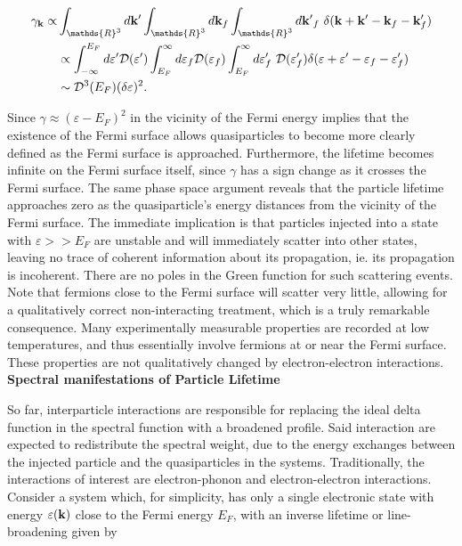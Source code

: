 \documentclass{homework}
\begin{document}
\begin{equation} \begin{split}
    \gamma_{\bf k} \propto & \int_{\mathds{R}^3} d{\bf k'} \int_{\mathds{R}^3} d{\bf k}_{f} \int_{\mathds{R}^3} d{\bf k'}_{f} \blanky \delta({\bf k} + {\bf k'} - {\bf k}_f - {\bf k}'_{f}) \\
    & \propto \int_{-\infty}^{E_F} d \varepsilon' \mathcal{D}(\varepsilon') \int_{E_F}^{\infty} d\varepsilon_{f} \mathcal{D}(\varepsilon_f) \int_{E_F}^{\infty} d\varepsilon'_{f}  \blanky \mathcal{D}(\varepsilon'_f) \delta(\varepsilon + \varepsilon' - \varepsilon_f - \varepsilon'_f) \\
    & \sim \mathcal{D}^{3}(E_F) (\delta \varepsilon)^2.
\end{split}
\end{equation}

Since $\gamma \approx (\varepsilon - E_F)^2$ in the vicinity of the Fermi energy implies that the existence of the Fermi surface allows quasiparticles to become more clearly defined as the Fermi surface is approached. Furthermore, the lifetime becomes infinite on the Fermi surface itself, since $\gamma$ has a sign change as it crosses the Fermi surface. The same phase space argument reveals that the particle lifetime approaches zero as the quasiparticle's energy distances from the vicinity of the Fermi surface. The immediate implication is that particles injected into a state with $\varepsilon >> E_F$ are unstable and will immediately scatter into other states, leaving no trace of coherent information about its propagation, ie. its propagation is incoherent. There are no poles in the Green function for such scattering events. Note that fermions close to the Fermi surface will scatter very little, allowing for a qualitatively correct non-interacting treatment, which is a truly remarkable consequence. Many experimentally measurable properties are recorded at low temperatures, and thus essentially involve fermions at or near the Fermi surface. These properties are not qualitatively changed by electron-electron interactions. \\

\textbf{Spectral manifestations of Particle Lifetime}

So far, interparticle interactions are responsible for replacing the ideal delta function in the spectral function with a broadened profile. Said interaction are expected to redistribute the spectral weight, due to the energy exchanges between the injected particle and the quasiparticles in the systems. Traditionally, the interactions of interest are electron-phonon and electron-electron interactions. Consider a system which, for simplicity, has only a single electronic state with energy $\varepsilon({\bf k})$ close to the Fermi energy $E_F$, with an inverse lifetime or line-broadening given by 
\end{document}

